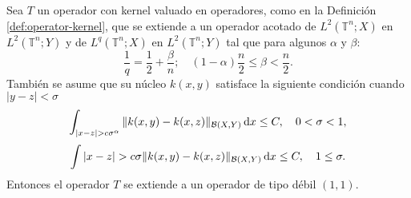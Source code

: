 \begin{theorem}
	Sea $T$ un operador con kernel valuado en operadores, como en la Definición \ref{def:operator-kernel}, que se extiende a un operador acotado de $L^2(\mathbb{T}^n; X)$ en $L^2(\mathbb{T}^n; Y)$ y de $L^q(\mathbb{T}^n; X)$ en $L^2(\mathbb{T}^n; Y)$ tal que para algunos $\alpha$ y $\beta$:
	\begin{equation}
		\frac{1}{q} = \frac{1}{2} + \frac{\beta}{n} ; \quad (1-\alpha)\frac{n}{2} \leq \beta < \frac{n}{2}.
		\label{eq:alpha_condition}
	\end{equation}
	También se asume que su núcleo $k(x, y)$ satisface la siguiente condición cuando $|y-z|<\sigma$
	\begin{equation}
		\int_{|x-z|>c\sigma^\alpha}\|k(x, y)-k(x,z)\|_{\mathcal{B}(X, Y)}\diff x\leq C, \quad 0<\sigma < 1,
		\label{eq:hyp-sigma<1}
	\end{equation}
	\begin{equation}
		\int{|x-z|>c\sigma}\|k(x, y)-k(x,z)\|_{\mathcal{B}(X, Y)}\diff x \leq C , \quad 1 \leq \sigma.
		\label{eq:hyp-sgima>1}
	\end{equation}
	Entonces el operador $T$ se extiende a un operador de tipo débil $(1,1)$.
	\label{theo:L1-weak}
\end{theorem}
